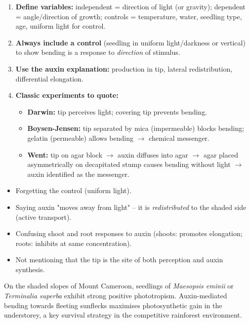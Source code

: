 \documentclass[11pt]{article}
\begin{document}
\begin{methode}
\begin{enumerate}
\item \textbf{Define variables:} independent = direction of light (or gravity); dependent = angle/direction of growth; controls = temperature, water, seedling type, age, uniform light for control.
\item \textbf{Always include a control} (seedling in uniform light/darkness or vertical) to show bending is a response to \emph{direction} of stimulus.
\item \textbf{Use the auxin explanation:} production in tip, lateral redistribution, differential elongation.
\item \textbf{Classic experiments to quote:}
\begin{itemize}
\item \textbf{Darwin:} tip perceives light; covering tip prevents bending.
\item \textbf{Boysen-Jensen:} tip separated by mica (impermeable) blocks bending; gelatin (permeable) allows bending $\rightarrow$ chemical messenger.
\item \textbf{Went:} tip on agar block $\rightarrow$ auxin diffuses into agar $\rightarrow$ agar placed asymmetrically on decapitated stump causes bending without light $\rightarrow$ auxin identified as the messenger.
\end{itemize}
\end{enumerate}
\end{methode}

\begin{attention}
\begin{itemize}
\item Forgetting the control (uniform light).
\item Saying auxin "moves away from light" -- it is \emph{redistributed} to the shaded side (active transport).
\item Confusing shoot and root responses to auxin (shoots: promotes elongation; roots: inhibits at same concentration).
\item Not mentioning that the tip is the site of both perception and auxin synthesis.
\end{itemize}
\end{attention}

\begin{savaistu}
On the shaded slopes of Mount Cameroon, seedlings of \emph{Maesopsis eminii} or \emph{Terminalia superba} exhibit strong positive phototropism. Auxin-mediated bending towards fleeting sunflecks maximises photosynthetic gain in the understorey, a key survival strategy in the competitive rainforest environment.
\end{savaistu}
\end{document}

